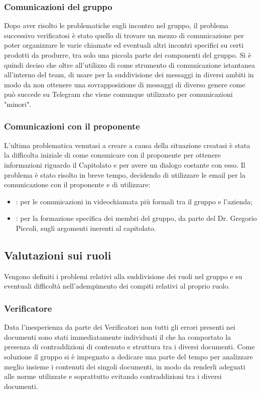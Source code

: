 \documentclass[../piano-di-qualifica.tex]{subfiles}
\begin{document}
\subsubsection{Comunicazioni del gruppo}
\label{sub:comunicazione_del_gruppo}
Dopo aver risolto le problematiche sugli incontro nel gruppo, il problema successivo verificatosi è stato quello di trovare un mezzo di comunicazione per poter organizzare le varie chiamate ed eventuali altri incontri specifici su certi prodotti da produrre, tra solo una piccola parte dei componenti del gruppo.
Si è quindi deciso che oltre all'utilizzo di  come strumento di comunicazione istantanea all'interno del team, di usare  per la suddivisione dei messaggi in diversi ambiti in modo da non ottenere una sovrapposizione di messaggi di diverso genere come può succede su Telegram che viene comunque utilizzato per comunicazioni "minori".

\subsubsection{Comunicazioni con il proponente}
\label{sub:comunicazione_con_il_proponente}
L'ultima problematica venutasi a creare a causa della situazione creatasi è stata la difficolta iniziale di come comunicare con il proponente per ottenere informazioni riguardo il Capitolato e per avere un dialogo costante con esso.
Il problema è stato risolto in breve tempo, decidendo di utilizzare le email per la comunicazione con il proponente e di utilizzare:
\begin{itemize}
    \item \textbf{}: per le comunicazioni in videochiamata più formali tra il gruppo e l'azienda;
    \item \textbf{}: per la formazione specifica dei membri del gruppo, da parte del Dr. Gregorio Piccoli, sugli argomenti inerenti al capitolato.
\end{itemize}

\subsection{Valutazioni sui ruoli}
\label{sub:valutazioni_ruoli}
Vengono definiti i problemi relativi alla suddivisione dei ruoli nel gruppo e su eventuali difficoltà nell'adempimento dei compiti relativi al proprio ruolo.
\subsubsection{Verificatore}
\label{sub:verificatore}
Data l'inesperienza da parte dei Verificatori non tutti gli errori presenti nei documenti sono stati immediatamente individuati il che ha comportato la presenza di contraddizioni di contenuto e struttura tra i diversi documenti.
Come soluzione il gruppo si è impegnato a dedicare una parte del tempo per analizzare meglio insieme i contenuti dei singoli documenti, in modo da renderli adeguati alle norme utilizzate e soprattutto evitando contraddizioni tra i diversi documenti.
\end{document}
